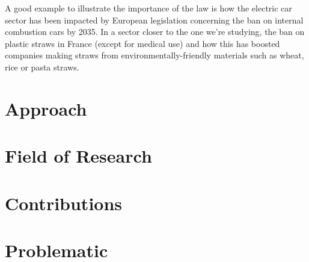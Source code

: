 A good example to illustrate the importance of the law is how the electric car sector has been impacted by European legislation concerning the ban on internal combustion cars by 2035. 
In a sector closer to the one we're studying, the ban on plastic straws in France (except for medical use) and how this has boosted companies making straws from environmentally-friendly materials such as wheat, rice or pasta straws.

\section{Approach}



\section{Field of Research}



\section{Contributions}




\section{Problematic}